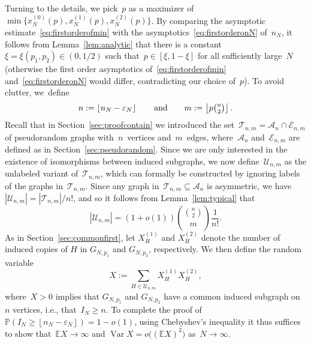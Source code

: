 \documentclass{article}
\newcommand{\eps}{\varepsilon}
\renewcommand{\Pr}{\mathbb{P}}
\newcommand{\E}{\mathbb{E}}
\newcommand{\cA}{\mathcal{A}}
\newcommand{\cE}{\mathcal{E}}
\newcommand{\cT}{\mathcal{T}}
\newcommand{\T}{\mathcal{U}_{n,m}}
\newcommand\floor[1]{\left\lfloor #1 \right \rfloor}
\newcommand{\xone}{x^{(1)}}
\newcommand{\xtwo}{x^{(2)}}
\newcommand{\xot}{x^{(0)}}
\newcommand{\Xone}{X^{(1)}}
\newcommand{\Xtwo}{X^{(2)}}
\newcommand{\nN}{n_N}
\newcommand\Var{\operatorname{Var}}
\newcommand\bigpar[1]{\bigl(#1\bigr)}
\newcommand\bigcpar[1]{\bigl\{#1\bigr\}}
\newcommand{\refS}[1]{Section~\ref{#1}}
\begin{document}
Turning to the details, we pick~$p$ as a maximizer of $\min\bigcpar{ \xot_N(p), \xone_N(p), \xtwo_N(p)}$.
By comparing the asymptotic estimate~\eqref{eq:firstorderofmin} with the  asymptotics~\eqref{eq:firstorderonN} of~$n_N$, it follows from Lemma~\ref{lem:analytic} that there is a constant~$\xi=\xi(p_1,p_2) \in (0,1/2)$ such that~${p \in [\xi,1-\xi]}$ for all sufficiently large~$N$ (otherwise the first order asymptotics of~\eqref{eq:firstorderofmin} and~\eqref{eq:firstorderonN} would differ, contradicting our choice of~$p$).
To avoid clutter,  we~define
\begin{equation}\label{eq:n:LB:m}
n:=\floor{\nN-\eps_N} \qquad \text{and} \qquad m:=\floor{p\tbinom{n}{2}}.
\end{equation}
Recall that in Section~\ref{sec:proofcontain} we introduced the set~$\cT_{n,m} = \cA_n \cap \cE_{n,m}$ of pseudorandom graphs with~$n$~vertices and~$m$~edges, where~$\cA_n$ and~$\cE_{n,m}$ are defined as in \refS{sec:pseudorandom}. 
Since we are only interested in the existence of isomorphisms between induced subgraphs, we now define~$\T$ as the unlabeled variant of~$\cT_{n,m}$, which can formally be constructed by ignoring labels of the graphs in~$\cT_{n,m}$.
Since any graph in~$\cT_{n,m} \subseteq \cA_n$ is asymmetric, we have~$|\T| = |\cT_{n,m}|/n!$, and so it follows from Lemma~\ref{lem:typical} that 
\begin{equation}\label{eq:sizet}
    |\T|= (1+o(1)) \binom{\binom{n}{2}}{m}\frac{1}{n!}.
\end{equation}
As in Section~\ref{sec:commonfirst}, let $\Xone_H$ and $\Xtwo_H$ denote the number of induced copies of $H$ in $G_{N,p_1}$ and $G_{N,p_2}$, respectively. We then define the random variable 
\begin{equation}\label{eq:defX}
    X := \sum_{H\in \T} \Xone_H\Xtwo_H ,
\end{equation}
where~$X>0$ implies that $G_{N,p_1}$ and $G_{N,p_2}$ have a common induced subgraph on $n$ vertices, i.e., that~${I_N \ge n}$. 
To complete the proof of~$\Pr(I_N \ge \floor{\nN-\eps_N})=1-o(1)$, using Chebyshev's inequality it thus suffices to show that~$\E X \to \infty$ and $\Var X = o\bigpar{(\E X)^2}$ as~$N \to \infty$. 
\end{document}
